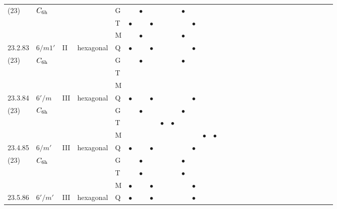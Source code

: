 \documentclass[fleqn,9pt,landscape]{jsarticle}
\begin{document}
\begin{longtable}{lllll|l|l|l|l|l|l|l|l|l|ll|ll|ll|ll|ll|ll|ll|ll}
(23) & $C_{\rm 6h}$ &  &  & G &  & $\bullet$ &  &  &  & $\bullet$ &  &  &  &  &  &  &  &  &  &  &  &  &  &  &  &  &  &  &  \\
 &  &  &  & T & $\bullet$ &  & $\bullet$ &  &  &  & $\bullet$ &  &  &  &  &  &  &  &  &  &  &  &  &  &  &  &  &  &  \\
 &  &  &  & M &  & $\bullet$ &  &  &  & $\bullet$ &  &  &  &  &  &  &  &  &  &  &  &  &  &  &  &  &  &  &  \\ \hline
23.2.83 & \texttt{$6/m1'$} & II & hexagonal & Q & $\bullet$ &  & $\bullet$ &  &  &  & $\bullet$ &  &  &  &  &  &  &  &  &  &  &  &  &  &  &  &  &  &  \\
(23) & $C_{\rm 6h}$ &  &  & G &  & $\bullet$ &  &  &  & $\bullet$ &  &  &  &  &  &  &  &  &  &  &  &  &  &  &  &  &  &  &  \\
 &  &  &  & T &  &  &  &  &  &  &  &  &  &  &  &  &  &  &  &  &  &  &  &  &  &  &  &  &  \\
 &  &  &  & M &  &  &  &  &  &  &  &  &  &  &  &  &  &  &  &  &  &  &  &  &  &  &  &  &  \\ \hline
23.3.84 & \texttt{$6'/m$} & III & hexagonal & Q & $\bullet$ &  & $\bullet$ &  &  &  & $\bullet$ &  &  &  &  &  &  &  &  &  &  &  &  &  &  &  &  &  &  \\
(23) & $C_{\rm 6h}$ &  &  & G &  & $\bullet$ &  &  &  & $\bullet$ &  &  &  &  &  &  &  &  &  &  &  &  &  &  &  &  &  &  &  \\
 &  &  &  & T &  &  &  & $\bullet$ & $\bullet$ &  &  &  &  &  &  &  &  &  &  &  &  &  &  &  &  &  &  &  &  \\
 &  &  &  & M &  &  &  &  &  &  &  & $\bullet$ & $\bullet$ &  &  &  &  &  &  &  &  &  &  &  &  &  &  &  &  \\ \hline
23.4.85 & \texttt{$6/m'$} & III & hexagonal & Q & $\bullet$ &  & $\bullet$ &  &  &  & $\bullet$ &  &  &  &  &  &  &  &  &  &  &  &  &  &  &  &  &  &  \\
(23) & $C_{\rm 6h}$ &  &  & G &  & $\bullet$ &  &  &  & $\bullet$ &  &  &  &  &  &  &  &  &  &  &  &  &  &  &  &  &  &  &  \\
 &  &  &  & T &  & $\bullet$ &  &  &  & $\bullet$ &  &  &  &  &  &  &  &  &  &  &  &  &  &  &  &  &  &  &  \\
 &  &  &  & M & $\bullet$ &  & $\bullet$ &  &  &  & $\bullet$ &  &  &  &  &  &  &  &  &  &  &  &  &  &  &  &  &  &  \\ \hline
23.5.86 & \texttt{$6'/m'$} & III & hexagonal & Q & $\bullet$ &  & $\bullet$ &  &  &  & $\bullet$ &  &  &  &  &  &  &  &  &  &  &  &  &  &  &  &  &  &  \\

\end{longtable}
\end{document}
